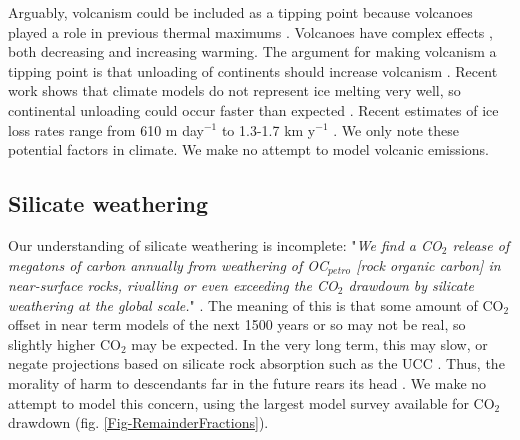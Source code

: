 \documentclass{article}
\begin{document}
Arguably, volcanism could be included as a tipping point because volcanoes played a role in previous thermal maximums \cite{Hochuli2016,Li2021a,Li2021b,Tong_Du2022103878,IEA2022CO2Emissions2021}. Volcanoes have complex effects \cite{StauntonSykes2021HalogensRadiativeForcing}, both decreasing \cite{ZielinskiVolcanism7000BCGISP2} and increasing \cite{Millan2022HungaTongaHydrationStratosphere} warming. The argument for making volcanism a tipping point is that unloading of continents should increase volcanism \cite{Sternai2016DeglaciationMagmaUnloading, VanVliet-lanoe2020VolcanismEnhanced}. Recent work shows that climate models do not represent ice melting very well, so continental unloading could occur faster than expected \cite{Pettit2021ThwaitesEasternCollapse, Fox2022TheComingCollapseSciAm}. Recent estimates of ice loss rates range from 610 m day$^{-1}$ \cite{Batchelor2023RapidIcdRetreatHundredsMetres} to 1.3-1.7 km y$^{-1}$ \cite{Milillo2022RapidGlacierRetreat}.  We only note these potential factors in climate. We make no attempt to model volcanic emissions.  

\subsection{Silicate weathering}
Our understanding of silicate weathering is incomplete: "\emph{We find a CO$_2$ release of megatons of carbon annually from weathering of OC$_{petro}$ [rock organic carbon] in near-surface rocks, rivalling or even exceeding the CO$_2$ drawdown by silicate weathering at the global scale.}" \cite{Zondervan2023RockCarbonCO2releaseOffsetsSilicateWeatheringSink}. The meaning of this is that some amount of CO$_2$ offset in near term models of the next 1500 years or so may not be real, so slightly higher CO$_2$ may be expected. In the very long term, this may slow, or negate projections based on silicate rock absorption such as the UCC \cite{Archer2020UltimateCostofCarbon, Archer2009AtmosphericLifetimeOfCO2}. Thus, the morality of harm to descendants far in the future rears its head \cite[p. 24]{Stern2021TheEconomicsofImmenseRiskUrgentActionandRadicalChange}\cite{Dasgupta2008DiscountngClimate}. We make no attempt to model this concern, using the largest model survey available for CO$_2$ drawdown (fig. \ref{Fig-RemainderFractions}).
\end{document}
